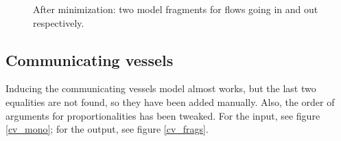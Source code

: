 \documentclass{article} %
\begin{document}
\begin{figure}[ht]
\centering
{}
\caption{After minimization: two model fragments for flows going in and out respectively.}
\label{sb_frags}
\end{figure}

\subsection{Communicating vessels} 

Inducing the communicating vessels model almost works, but the last two
equalities are not found, so they have been added manually. Also, the order of
arguments for proportionalities has been tweaked.  For the input, see
figure \ref{cv_mono}; for the output, see figure \ref{cv_frags}.
\end{document}
